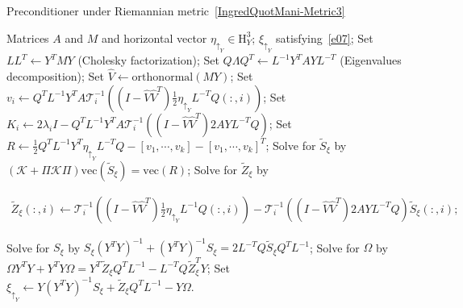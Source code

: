 \documentclass[11pt]{article}
\numberwithin{equation}{section}
\begin{document}
\begin{algorithm}[htbp]
  \caption{Preconditioner under Riemannian metric~\eqref{IngredQuotMani-Metric3}} 
  \begin{algorithmic}[1] \label{Precond-Metric3-Alg}
  \REQUIRE Matrices $A$ and $M$ and horizontal vector $\eta_{\uparrow_Y}\in\mathrm{H}_Y^3$;
  \ENSURE $\xi_{\uparrow_Y}$ satisfying~\eqref{e07};
  \STATE Set $LL^T\gets Y^TMY$ (Cholesky factorization);
  \STATE Set $Q\Lambda Q^T \gets L^{-1}Y^TAYL^{-T}$ (Eigenvalues decomposition); 
  \STATE Set $\hat{V}\gets \mathrm{orthonormal}(MY)$;
  \STATE Set $v_i\gets Q^TL^{-1}Y^TA\mathcal{T}_i^{-1}\left( (I-\hat{V}\hat{V}^T)\frac{1}{2}\eta_{\uparrow_Y}L^{-T}Q(:,i)\right)$;
  \STATE Set $K_i\gets 2\lambda_iI-Q^TL^{-1}Y^TA\mathcal{T}_i^{-1}\left( (I-\hat{V}\hat{V}^T)2AYL^{-T}Q\right)$;
  \STATE Set $R\gets \frac{1}{2}Q^TL^{-1}Y^T\eta_{\uparrow_Y}L^{-T}Q-[v_1,\cdots,v_k]-[v_1,\cdots,v_k]^T$;
  \STATE Solve for $\tilde{S}_\xi$ by $(\mathcal{K}+\Pi\mathcal{K}\Pi)\mathrm{vec}(\tilde{S}_\xi)=\mathrm{vec}(R)$;
  \STATE Solve for $\tilde{Z}_\xi$ by 
  \begin{small}  	  
  \begin{align*} \nonumber
	  \tilde{Z}_\xi (:, i)\gets \mathcal{T}_i^{-1}\left((I-\hat{V}\hat{V}^T)\frac{1}{2}\eta_{\uparrow_Y}L^{-1}Q(:,i)\right) - \mathcal{T}_i^{-1}\left((I-\hat{V}\hat{V}^T)2AYL^{-T}Q\right)\tilde{S}_\xi(:,i);
  \end{align*}
  \end{small}
  \STATE Solve for $S_\xi$ by $S_\xi(Y^TY)^{-1}+(Y^TY)^{-1}S_\xi=2L^{-T}Q\tilde{S}_\xi Q^TL^{-1}$; \label{Precond-Metric3-Sum-Sxi}
  \STATE Solve for $\Omega$ by $\Omega Y^TY + Y^TY \Omega = Y^T\tilde{Z}_{\xi}Q^TL^{-1} - L^{-T}Q\tilde{Z}_{\xi}^TY$; \label{Precond-Metric3-for-Omega}
  \STATE Set $\xi_{\uparrow_Y}\gets Y(Y^TY)^{-1}S_\xi+\tilde{Z}_\xi Q^{T}L^{-1} - Y\Omega$. 
  
 \end{algorithmic}
\end{algorithm}

\end{document}
